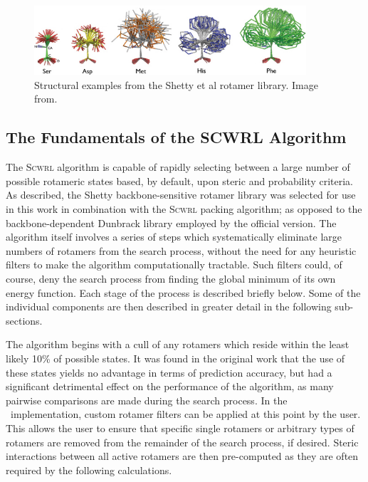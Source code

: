 \begin{figure}[htpb]
\begin{center}
\includegraphics[width=0.9\textwidth]{./09-Arcus/shetty/shetty.png}
\caption[Structural examples from the Shetty rotamer library.]{Structural examples from the Shetty et al rotamer library. Image from\cite{NATIVE:Shetty2003}.}
\label{fig:arcus:shetty}
\end{center}
\end{figure}

\subsection{The Fundamentals of the SCWRL Algorithm}

The \textsc{Scwrl} algorithm is capable of rapidly selecting between a large number of possible rotameric states based, by default, upon steric and probability criteria.
As described, the Shetty backbone-sensitive rotamer library was selected for use in this work in combination with the \textsc{Scwrl} packing algorithm;  as opposed to the backbone-dependent Dunbrack library employed by the official version.
The algorithm itself involves a series of steps which systematically eliminate large numbers of rotamers from the search process, without the need for any heuristic filters to make the algorithm computationally tractable. Such filters could, of course, deny the search process from finding the global minimum of its own energy function. Each stage of the process is described briefly below. Some of the individual components are then described in greater detail in the following sub-sections.

The algorithm begins with a cull of any rotamers which reside within the least likely 10\% of possible states. It was found in the original work that the use of these states yields no advantage in terms of prediction accuracy, but had a significant detrimental effect on the performance of the algorithm, as many pairwise comparisons are made during the search process.
In the \pd\ implementation, custom rotamer filters can be applied at this point by the user. This allows the user to ensure that specific single rotamers or arbitrary types of rotamers are removed from the remainder of the search process, if desired.
Steric interactions between all active rotamers are then pre-computed
as they are often required by the following calculations.


